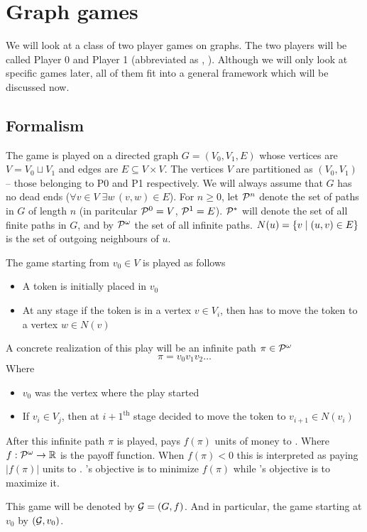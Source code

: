 \chapter{Graph games}
\label{chap:formalism}
We will look at a class of two player games on graphs. The two players will be called Player 0 and Player 1 (abbreviated as , ). Although we will only look at specific games later, all of them fit into a general framework which will be discussed now.
\section{Formalism}
\label{sec:formalism}
The game is played on a directed graph $G=(V_0,V_1,E)$ whose vertices are $V=V_0 \sqcup V_1$ and edges are $E \subseteq V\times V$. The vertices $V$ are partitioned as $(V_0,V_1)$ -- those belonging to P0 and P1 respectively. We will always assume that $G$ has no dead ends ($\forall v \in V \; \exists w \, (v,w) \in E$). For $n \geq 0$, let $\PF[n]$ denote the set of paths in $G$ of length $n$ (in paritcular $\PF[0]=V$, $\PF[1]=E$). $\PF$ will denote the set of all finite paths in $G$, and by $\PI$ the set of all infinite paths. $N(u)=\set{v \mid (u,v) \in E}$ is the set of outgoing neighbours of $u$.

The game starting from $v_0 \in V$ is played as follows
\begin{itemize}
  \item A token is initially placed in $v_0$
  \item At any stage if the token is in a vertex $v \in V_i$, then  has to move the token to a vertex $w \in N(v)$
\end{itemize}
A concrete realization of this play will be an infinite path $\pi \in \PI$
\[
  \pi = v_0 v_1 v_2 \ldots
\]
Where
\begin{itemize}
  \item $v_0$ was the vertex where the play started
  \item If $v_i \in V_j$, then at ${i+1}^\text{th}$ stage  decided to move the token to $v_{i+1} \in N(v_i)$
\end{itemize}
After this infinite path $\pi$ is played,  pays $f(\pi)$ units of money to . Where $f : \PI \to \Reals
$ is the payoff function. When $f(\pi) < 0$ this is interpreted as  paying $|f(\pi)|$ units to . 's objective is to minimize $f(\pi)$ while 's objective is to maximize it.

This game will be denoted by $\G=(G,f)$. And in particular, the game  starting at $v_0$ by $(\G,v_0)$.

